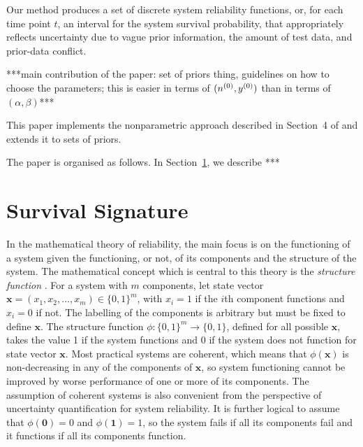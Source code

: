 \documentclass[12pt, a4paper]{elsarticle}
\newcommand{\bs}[1]{\boldsymbol{#1}}
\renewcommand{\vec}[1]{{\bs#1}}
\begin{document}
Our method produces a set of discrete system reliability functions,
or, for each time point $t$, an interval for the system survival probability,
that appropriately reflects uncertainty due to vague prior information, the amount of test data, and prior-data conflict.

***main contribution of the paper:
set of priors thing,
guidelines on how to choose the parameters;
this is easier in terms of $(n^{(0)}, y^{(0)})$ than in terms of $(\alpha, \beta)$***

This paper implements the nonparametric approach described in Section~4 of \citet{2015:bayessurvsign}
and extends it to sets of priors.

The paper is organised as follows.
In Section~\ref{sec:survsign}, we describe ***
\fi

\section{Survival Signature}
\label{sec:survsign}

In the mathematical theory of reliability, the main focus is on the functioning of a system given the functioning, or not, 
of its components and the structure of the system. The mathematical concept which is central to this theory is the 
\emph{structure function} \citep{BP75}. For a system with $m$ components, let state vector 
$\vec{x} = (x_1,x_2,\ldots,x_m) \in \{0,1\}^m$, with $x_i=1$ if the $i$th component functions 
and $x_i=0$ if not. The labelling of the components is arbitrary but must be fixed to define $\vec{x}$. 
The structure function $\phi : \{0,1\}^m \rightarrow \{0,1\}$, defined for all possible $\vec{x}$, takes 
the value 1 if the system functions and 0 if the system does not function for state vector $\vec{x}$. 
Most practical systems are coherent, which means that $\phi(\vec{x})$ 
is non-decreasing in any of the components of $\vec{x}$, so system functioning cannot be improved by worse performance 
of one or more of its components. The assumption of coherent systems is also convenient from the perspective of uncertainty
quantification for system reliability. It is further logical to assume that $\phi(\vec{0})=0$ and $\phi(\vec{1})=1$, 
so the system fails if all its components fail and it functions if all its components function. 
\end{document}

